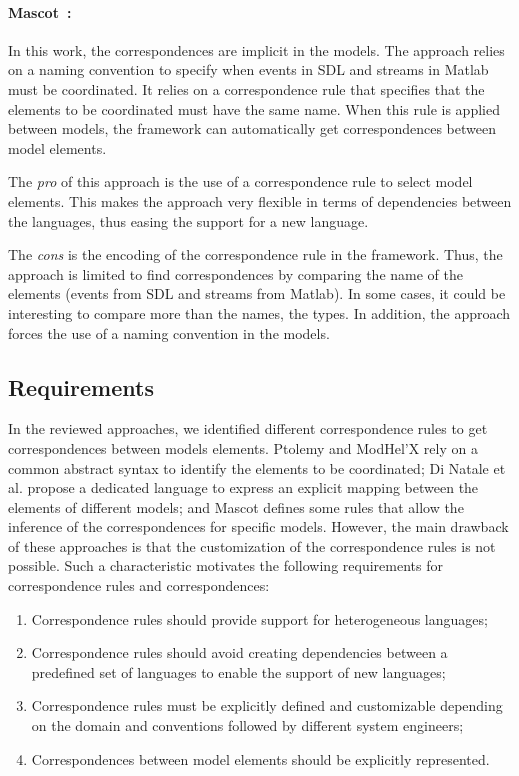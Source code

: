 {\paragraph{Mascot~\cite{mascotbib}:} In this work, the correspondences are implicit in the models. The approach relies on a naming convention to specify when events in SDL and streams in Matlab must be coordinated. It relies on a correspondence rule that specifies that the elements to be coordinated must have the same name. When this rule is applied between models, the framework can automatically get correspondences between model elements.

The \emph{pro} of this approach is the use of a correspondence rule to select model elements. This makes the approach very flexible in terms of dependencies between the languages, thus easing the support for a new language.  

The \emph{cons} is the encoding of the correspondence rule in the framework. Thus, the approach is limited to find correspondences by comparing the name of the elements (\ie events from SDL and streams from Matlab). In some cases, it could be interesting to compare more than the names, \eg the types. In addition, the approach forces the use of a naming convention in the models.     


\subsection{Requirements}
In the reviewed approaches, we identified different correspondence rules to get correspondences between models elements. Ptolemy and ModHel'X rely on a common abstract syntax to identify the elements to be coordinated; Di Natale et al. propose a dedicated language to express an explicit mapping between the elements of different models; and Mascot defines some rules that allow the inference of the correspondences for specific models. However, the main drawback of these approaches is that the customization of the correspondence rules is not possible. Such a characteristic motivates the following requirements for correspondence rules and correspondences:

\begin{enumerate}
	\item Correspondence rules should provide support for heterogeneous languages; 
	\item Correspondence rules should avoid creating dependencies between a predefined set of languages to enable the support of new languages;
	\item Correspondence rules must be explicitly defined and customizable depending on the domain and conventions followed by different system engineers;
	\item Correspondences between model elements should be explicitly represented.  
\end{enumerate}

}
